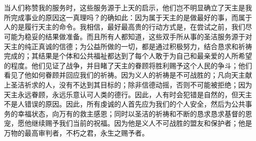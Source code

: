 
\section{}

当人们称赞我的服务时，这些服务源于上天的启示，他们岂不明显确立了天主是我所完成事业的原因这一真理吗？的确如此：因为属于天主的是做最好的事，而属于人的是履行天主的命令。我相信，最好最高贵的行动方式是，在尝试之前，我们尽可能为稳妥的结果做准备。而且所有人都知道，这些双手所从事的圣洁服务源于对天主的纯正真诚的信德；为公益所做的一切，都是通过积极努力，结合恳求和祈祷完成的；其结果是个体和公共福祉都达到了每个人敢于为自己和最亲爱的人所希望的程度。他们见证了战争，并目睹了天主的眷顾将胜利赐予这个人民的争斗；他们看见了他如何眷顾并回应我们的祈祷。因为义人的祈祷是不可战胜的；凡向天主献上圣洁祈求的人，没有不达到其目标的；除非信德动摇，否则不可能被拒绝；因为天主永远眷顾，永远乐意认可人类的德行。因此，人有时会犯错是自然的，但天主不是人错误的原因。因此，所有虔诚的人首先应为我们的个人安全，然后为公共事务的幸福状态，向万有的救主感恩；同时以圣洁的祈祷和不断的恳求恳求基督的恩宠，愿他继续赐予我们当前的祝福。因为他是义人不可战胜的盟友和保护者；他是万物的最高审判者，不朽之君，永生之赐予者。\par

